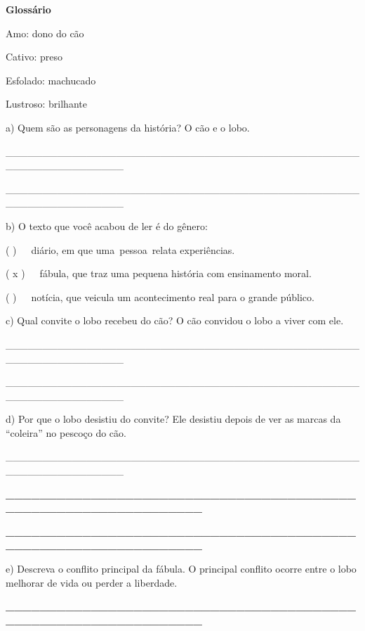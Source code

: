 \begin{itemize}
{{{\begin{itemize}
\begin{itemize}
\begin{itemize}
\textbf{Glossário}

Amo: dono do cão

Cativo: preso

Esfolado: machucado

Lustroso: brilhante

a) Quem são as personagens da história? O cão e o lobo.

\_\_\_\_\_\_\_\_\_\_\_\_\_\_\_\_\_\_\_\_\_\_\_\_\_\_\_\_\_\_\_\_\_\_\_\_\_\_\_\_\_\_\_\_\_\_\_\_\_\_\_\_\_\_\_\_\_\_\_\_\_\_\_\_

\_\_\_\_\_\_\_\_\_\_\_\_\_\_\_\_\_\_\_\_\_\_\_\_\_\_\_\_\_\_\_\_\_\_\_\_\_\_\_\_\_\_\_\_\_\_\_\_\_\_\_\_\_\_\_\_\_\_\_\_\_\_\_\_

b) O texto que você acabou de ler é do gênero:

( )~~~diário, em que uma~pessoa~relata experiências.

( x )~~~fábula, que traz uma pequena história com ensinamento moral.

( )~~~notícia, que veicula um acontecimento real para o grande público.

c) Qual convite o lobo recebeu do cão? O cão convidou o lobo a viver com
ele.

\_\_\_\_\_\_\_\_\_\_\_\_\_\_\_\_\_\_\_\_\_\_\_\_\_\_\_\_\_\_\_\_\_\_\_\_\_\_\_\_\_\_\_\_\_\_\_\_\_\_\_\_\_\_\_\_\_\_\_\_\_\_\_\_

\_\_\_\_\_\_\_\_\_\_\_\_\_\_\_\_\_\_\_\_\_\_\_\_\_\_\_\_\_\_\_\_\_\_\_\_\_\_\_\_\_\_\_\_\_\_\_\_\_\_\_\_\_\_\_\_\_\_\_\_\_\_\_\_

d) Por que o lobo desistiu do convite? Ele desistiu depois de ver as
marcas da ``coleira'' no pescoço do cão.

\_\_\_\_\_\_\_\_\_\_\_\_\_\_\_\_\_\_\_\_\_\_\_\_\_\_\_\_\_\_\_\_\_\_\_\_\_\_\_\_\_\_\_\_\_\_\_\_\_\_\_\_\_\_\_\_\_\_\_\_\_\_\_\_

\protect\hypertarget{_Hlk127806075}{}{}\textbf{\_\_\_\_\_\_\_\_\_\_\_\_\_\_\_\_\_\_\_\_\_\_\_\_\_\_\_\_\_\_\_\_\_\_\_\_\_\_\_\_\_\_\_\_\_\_\_\_\_\_\_\_\_\_\_\_\_\_\_\_\_\_\_\_}

\textbf{\_\_\_\_\_\_\_\_\_\_\_\_\_\_\_\_\_\_\_\_\_\_\_\_\_\_\_\_\_\_\_\_\_\_\_\_\_\_\_\_\_\_\_\_\_\_\_\_\_\_\_\_\_\_\_\_\_\_\_\_\_\_\_\_}

e) Descreva o conflito principal da fábula. O principal conflito ocorre
entre o lobo melhorar de vida ou perder a liberdade.

\textbf{\_\_\_\_\_\_\_\_\_\_\_\_\_\_\_\_\_\_\_\_\_\_\_\_\_\_\_\_\_\_\_\_\_\_\_\_\_\_\_\_\_\_\_\_\_\_\_\_\_\_\_\_\_\_\_\_\_\_\_\_\_\_\_\_}


\end{itemize}
\end{itemize}
\end{itemize}}}}
\end{itemize}
